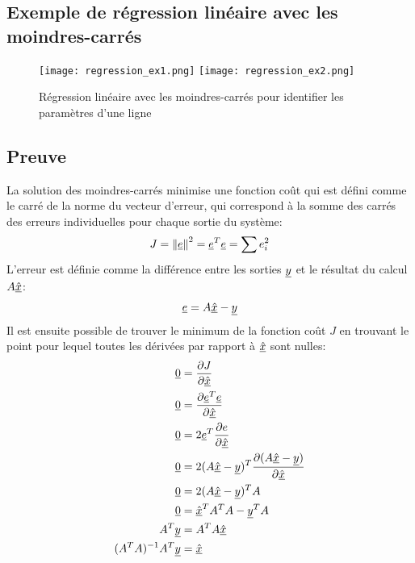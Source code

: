 \subsection{Exemple de régression linéaire avec les moindres-carrés}

\begin{figure}[htbp]
	\centering
		\texttt{[image: regression\_ex1.png]}
		\texttt{[image: regression\_ex2.png]}
	\caption{Régression linéaire avec les moindres-carrés pour identifier les paramètres d'une ligne}
	\label{fig:regression-ex1}
\end{figure}


\subsection{Preuve}

La solution des moindres-carrés minimise une fonction coût qui est défini comme le carré de la norme du vecteur d'erreur, qui correspond à la somme des carrés des erreurs individuelles pour chaque sortie du système:
\begin{align}
J = \left\| \underline{e} \right\|^2  = \underline{e}^T\underline{e} = \sum{ e_i^2}
\end{align}
L'erreur est définie comme la différence entre les sorties $\underline{y}$ et le résultat du calcul $A \underline{\hat{x}}$:
\begin{align}
\underline{e} = A \underline{\hat{x}} - \underline{y}
\end{align}
Il est ensuite possible de trouver le minimum de la fonction coût $J$ en trouvant le point pour lequel toutes les dérivées par rapport à $\underline{\hat{x}}$ sont nulles:
\begin{align}
\underline{0} &= \frac{\partial J}{\partial \underline{\hat{x}}} \\
\underline{0} &= \frac{\partial \underline{e}^T\underline{e}}{\partial \underline{\hat{x}}} \\
\underline{0} &= 2 \underline{e}^T \frac{\partial e }{\partial \underline{\hat{x}}} \\
\underline{0} &= 2 ( A \underline{\hat{x}} -\underline{y} )^T \frac{\partial (A \underline{\hat{x}} -\underline{y}) }{\partial \underline{\hat{x}}} \\
\underline{0} &= 2 ( A \underline{\hat{x}} -\underline{y}  )^T A  \\
\underline{0} &=  \underline{\hat{x}}^T A^T A  - \underline{y}^T A   \\
A^T \underline{y} &= A^T A \underline{\hat{x}} \\
(A^T A)^{-1} A^T \underline{y} &= \underline{\hat{x}} 
\end{align}

